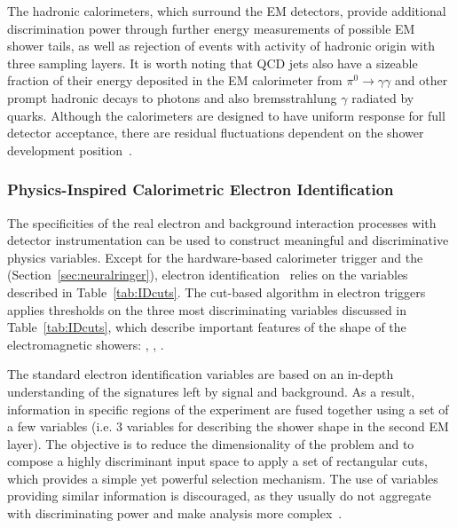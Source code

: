The hadronic calorimeters, which surround the EM detectors,
provide additional discrimination power through further energy measurements of
possible EM shower tails, as well as rejection of events with activity of
hadronic origin with three sampling layers. It is worth noting that QCD jets also have a sizeable fraction of their energy deposited in the EM calorimeter from $\pi^{0}\rightarrow\gamma\gamma$
and other prompt hadronic decays to photons and also bremsstrahlung $\gamma$ radiated by quarks.
Although the calorimeters are designed 
to have uniform response for full detector acceptance, there are residual fluctuations 
dependent on the shower development position~\cite{Wigmans2017}.



\subsubsection{Physics-Inspired Calorimetric Electron Identification}%

The specificities of the real electron and background interaction processes with
detector instrumentation can be used to construct meaningful and discriminative physics variables. Except for the hardware-based calorimeter trigger
and the \rnn (Section~\ref{sec:neuralringer}), electron
identification~\cite{atlas_electron_id_offline} relies on the variables
described in Table~\ref{tab:IDcuts}. 
The cut-based algorithm in electron
triggers applies thresholds on the three most discriminating variables discussed in Table~\ref{tab:IDcuts}, which describe important features of the shape of the electromagnetic showers: \reta{}, \eratio{}, \rhadone{}.




  
The standard electron identification variables are based on an in-depth
understanding of the signatures left by signal and background.  As a result, information in specific regions of the experiment
are fused together using a set of a few variables (i.e. 3 variables for describing the shower shape in the second EM layer). The objective is to reduce the dimensionality of the problem and to compose a highly discriminant input space to apply a set of rectangular cuts, which provides a simple yet powerful selection mechanism. The use of variables providing similar information is discouraged, as they usually do not aggregate with
discriminating power and make analysis more
complex~\cite{aaboud2019electron}.

